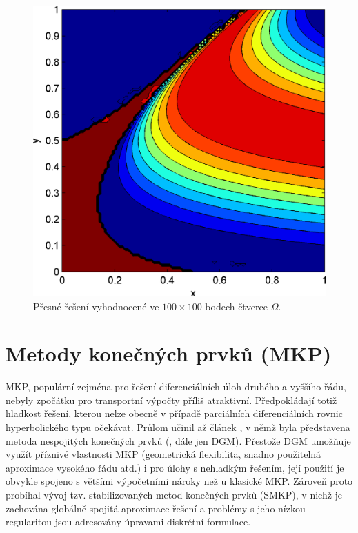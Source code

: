 \documentclass{sna}
\begin{document}
\begin{itemize}
\begin{figure}[h]
\begin{center}
    \includegraphics[scale=.12]{exactc.eps}    
    \caption{Přesné řešení vyhodnocené ve $100\times100$ bodech čtverce $\Omega$.}
    \label{fig:ref}
   \end{center}
  \end{figure}
\end{itemize}

\section{Metody konečných prvků (MKP)}
MKP, populární zejména pro řešení diferenciálních úloh druhého a vyššího řádu, nebyly zpočátku pro transportní výpočty příliš atraktivní. Předpokládají totiž hladkost řešení, kterou nelze obecně v případě parciálních diferenciálních rovnic hyperbolického typu očekávat. Průlom učinil až článek \cite{Reed}, v němž byla představena metoda nespojitých konečných prvků (, dále jen DGM). Přestože DGM umožňuje využít příznivé vlastnosti MKP (geometrická flexibilita, snadno použitelná aproximace vysokého řádu atd.) i pro úlohy s nehladkým řešením, její použití je obvykle spojeno s většími výpočetními nároky než u klasické MKP. Zároveň proto probíhal vývoj tzv. stabilizovaných metod konečných prvků (SMKP), v nichž je zachována globálně spojitá aproximace řešení a problémy s jeho nízkou regularitou jsou adresovány úpravami diskrétní formulace. 
\end{document}
